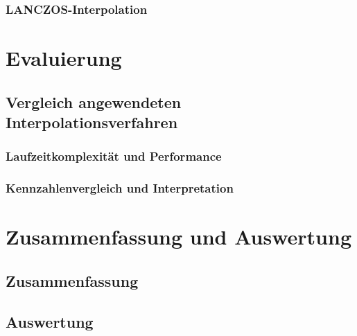 \documentclass[
fontsize=10pt, 
listof = totoc,
parskip = half	
]{report}
\begin{document}
\subsection{LANCZOS-Interpolation}



\chapter{Evaluierung}

\section{Vergleich angewendeten Interpolationsverfahren}

\subsection{Laufzeitkomplexität und Performance}

\subsection{Kennzahlenvergleich und Interpretation}

\chapter{Zusammenfassung und Auswertung}

\section{Zusammenfassung}

\section{Auswertung}




\end{document}
